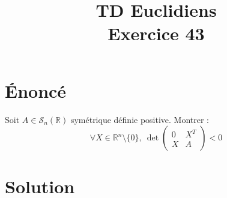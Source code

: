 \documentclass[french]{article}
\title{TD Euclidiens\\ Exercice 43}
\date{}
\newcommand{\R}{\mathbb{R}}
\begin{document}
\maketitle

\section{Énoncé}
Soit $A\in\mathcal{S}_n(\R)$ symétrique définie positive. Montrer : $$\forall X\in\R^n\setminus\{0\},\ \det\begin{pmatrix}
	0&X^T\\
	X&A
\end{pmatrix}<0$$
\section{Solution}
\end{document}
